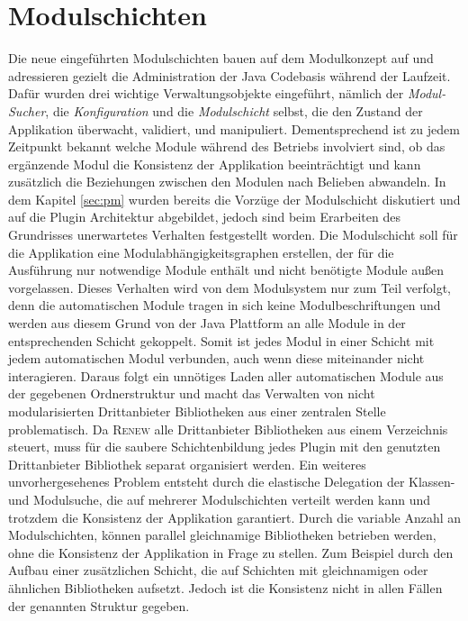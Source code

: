 \section{Modulschichten}
Die neue eingeführten Modulschichten bauen auf dem Modulkonzept auf und adressieren gezielt die Administration der Java Codebasis während der Laufzeit. Dafür wurden drei wichtige Verwaltungsobjekte eingeführt, nämlich der \textit{Modul-Sucher}, die \textit{Konfiguration} und die \textit{Modulschicht} selbst, die den Zustand der Applikation überwacht, validiert, und manipuliert. Dementsprechend ist zu jedem Zeitpunkt bekannt welche Module während des Betriebs involviert sind, ob das ergänzende Modul die Konsistenz der Applikation beeinträchtigt und kann zusätzlich die Beziehungen zwischen den Modulen nach Belieben abwandeln. In dem Kapitel \ref{sec:pm} wurden bereits die Vorzüge der Modulschicht diskutiert und auf die Plugin Architektur abgebildet, jedoch sind beim Erarbeiten des Grundrisses unerwartetes Verhalten festgestellt worden.\newline
Die Modulschicht soll für die Applikation eine Modulabhängigkeitsgraphen erstellen, der für die Ausführung nur notwendige Module enthält und nicht benötigte Module außen vorgelassen. Dieses Verhalten wird von dem Modulsystem nur zum Teil verfolgt, denn die automatischen Module tragen in sich keine Modulbeschriftungen und werden aus diesem Grund von der Java Plattform an alle Module in der entsprechenden Schicht gekoppelt. Somit ist jedes Modul in einer Schicht mit jedem automatischen Modul verbunden, auch wenn diese miteinander nicht interagieren. Daraus folgt ein unnötiges Laden aller automatischen Module aus der gegebenen Ordnerstruktur und macht das Verwalten von nicht modularisierten Drittanbieter Bibliotheken aus einer zentralen Stelle problematisch. Da \textsc{Renew} alle Drittanbieter Bibliotheken aus einem Verzeichnis steuert, muss für die saubere Schichtenbildung jedes Plugin mit den genutzten Drittanbieter Bibliothek separat organisiert werden.\newline
Ein weiteres unvorhergesehenes Problem entsteht durch die elastische Delegation der Klassen- und Modulsuche, die auf mehrerer Modulschichten verteilt werden kann und trotzdem die Konsistenz der Applikation garantiert.
Durch die variable Anzahl an Modulschichten, können parallel gleichnamige Bibliotheken betrieben werden, ohne die Konsistenz der Applikation in Frage zu stellen. Zum Beispiel durch den Aufbau einer zusätzlichen Schicht, die auf Schichten mit gleichnamigen oder ähnlichen Bibliotheken aufsetzt. Jedoch ist die Konsistenz nicht in allen Fällen der genannten Struktur gegeben. \newline
